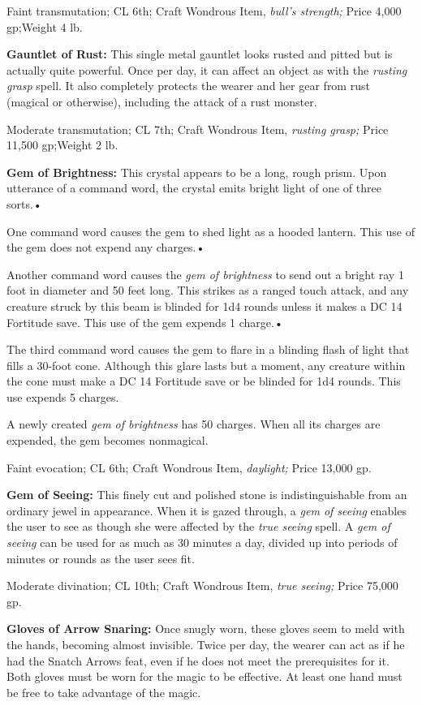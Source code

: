 \documentclass{article}
\begin{document}
Faint transmutation; CL 6th; Craft Wondrous Item, \textit{bull's strength; }Price 
4,000 gp;Weight 4 lb.

\textbf{Gauntlet of Rust:} This single metal gauntlet looks rusted and pitted but 
is actually quite powerful. Once per day, it can affect an object as with the \textit{rusting 
grasp }spell. It also completely protects the wearer and her gear from rust (magical 
or otherwise), including the attack of a rust monster.

Moderate transmutation; CL 7th; Craft Wondrous Item, \textit{rusting grasp; }Price 
11,500 gp;Weight 2 lb.

\textbf{Gem of Brightness:} This crystal appears to be a long, rough prism. Upon 
utterance of a command word, the crystal emits bright light of one of three sorts.• 

\parindent=3pt
One command word causes the gem to shed light as a hooded lantern. This use of 
the gem does not expend any charges.• 

Another command word causes the \textit{gem of brightness }to send out a bright 
ray 1 foot in diameter and 50 feet long. This strikes as a ranged touch attack, 
and any creature struck by this beam is blinded for 1d4 rounds unless it makes 
a DC 14 Fortitude save. This use of the gem expends 1 charge.• 

The third command word causes the gem to flare in a blinding flash of light that 
fills a 30-foot cone. Although this glare lasts but a moment, any creature within 
the cone must make a DC 14 Fortitude save or be blinded for 1d4 rounds. This use 
expends 5 charges.

A newly created \textit{gem of brightness }has 50 charges. When all its charges 
are expended, the gem becomes nonmagical.

\parindent=0pt
Faint evocation; CL 6th; Craft Wondrous Item, \textit{daylight; }Price 13,000 gp.

\textbf{Gem of Seeing: }This finely cut and polished stone is indistinguishable 
from an ordinary jewel in appearance. When it is gazed through, a \textit{gem of 
seeing }enables the user to see as though she were affected by the \textit{true 
seeing }spell. A \textit{gem of seeing }can be used for as much as 30 minutes a 
day, divided up into periods of minutes or rounds as the user sees fit.

Moderate divination; CL 10th; Craft Wondrous Item, \textit{true seeing; }Price 
75,000 gp.

\textbf{Gloves of Arrow Snaring: }Once snugly worn, these gloves seem to meld with 
the hands, becoming almost invisible. Twice per day, the wearer can act as if he 
had the Snatch Arrows feat, even if he does not meet the prerequisites for it. 
Both gloves must be worn for the magic to be effective. At least one hand must 
be free to take advantage of the magic.
\end{document}
